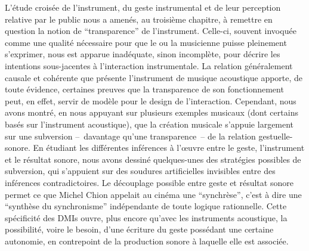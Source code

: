 \noindent L’étude croisée de l’instrument, du geste instrumental et de leur perception relative par le public nous a amenés, au troisième chapitre, à remettre en question la notion de ``transparence'' de l’instrument. Celle-ci, souvent invoquée comme une qualité nécessaire pour que le ou la musicienne puisse pleinement s’exprimer, nous est apparue inadéquate, sinon incomplète, pour décrire les intentions sous-jacentes à l’interaction instrumentale. La relation généralement causale et cohérente que présente l’instrument de musique acoustique apporte, de toute évidence, certaines preuves que la transparence de son fonctionnement peut, en effet, servir de modèle pour le design de l’interaction. Cependant, nous avons montré, en nous appuyant sur plusieurs exemples musicaux (dont certains basés sur l’instrument acoustique), que la création musicale s’appuie largement sur une subversion --~davantage qu’une transparence~-- de la relation gestuelle-sonore. En étudiant les différentes inférences à l’œuvre entre le geste, l’instrument et le résultat sonore, nous avons dessiné quelques-unes des stratégies possibles de subversion, qui s’appuient sur des soudures artificielles invisibles entre des inférences contradictoires. Le découplage possible entre geste et résultat sonore permet ce que Michel Chion appelait au cinéma une ``synchrèse'', c'est à dire une ``synthèse du synchronisme'' indépendante de toute logique rationnelle\cite{chion_audio-vision:_2013}. Cette spécificité des \glspl{DMI} ouvre, plus encore qu'avec les instruments acoustique, la possibilité, voire le besoin, d'une écriture du geste possédant une certaine autonomie, en contrepoint de la production sonore à laquelle elle est associée.

\noindent 

